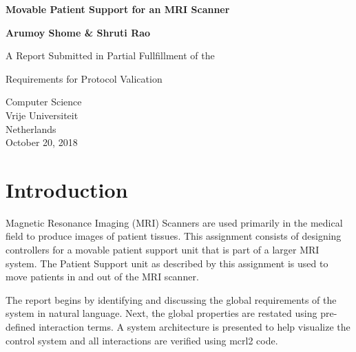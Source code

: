 \documentclass{article}
\author{Arumoy Shome & Shruti Rao}
\date{20 October, 2018}
\begin{document}
\begin{titlepage}
    \begin{center}
        \vspace*{1cm}
        
        \huge
        
        \textbf{Movable Patient Support for an MRI Scanner}
        \vspace{1.5cm}
        
        \textbf{Arumoy Shome \& Shruti Rao}
        
        \vfill
        
        A Report Submitted in Partial Fullfillment of the 
        
        Requirements for Protocol Valication
        
        \vspace{0.8cm}
        
        \large
        Computer Science\\
        Vrije Universiteit\\
        Netherlands\\
        October 20, 2018
    \end{center}
\end{titlepage}

\newpage
\thispagestyle{empty}
\tableofcontents
\newpage
\thispagestyle{empty}
\listoffigures
\newpage
\thispagestyle{empty}
\listoftables
{}

\newpage
\section{Introduction}
Magnetic Resonance Imaging (MRI) Scanners are used primarily in the medical field to produce images of patient tissues\cite{yanke_haken_aisen_fraass_thornton_1991}. This assignment consists of designing controllers for a movable patient support unit that is part of a larger MRI system. The Patient Support unit as described by this assignment is used to move patients in and out of the MRI scanner.

The report begins by identifying and discussing the global requirements of the system in natural language. Next, the global properties are restated using pre-defined interaction terms. A system architecture is presented to help visualize the control system and all interactions are verified using mcrl2 code\cite{mcrl2}. 
\end{document}
